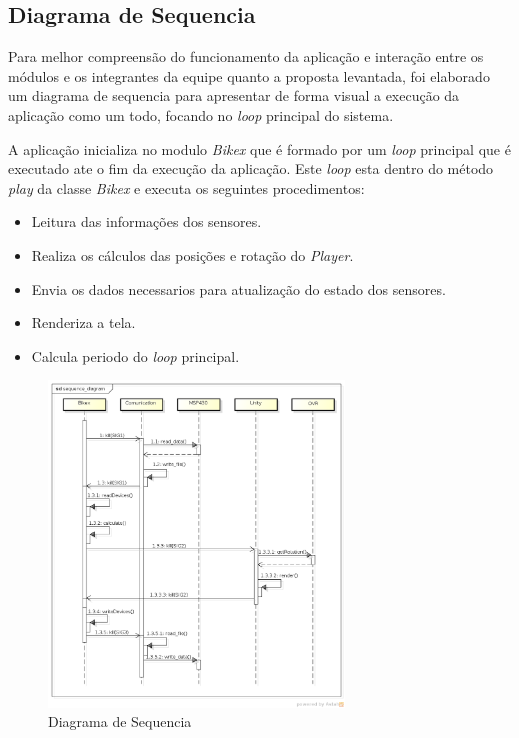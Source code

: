 \subsection{Diagrama de Sequencia} %
\label{sec:diagrama_de_sequencia}

Para melhor compreensão do funcionamento da aplicação e interação entre os módulos e os integrantes da equipe quanto a proposta levantada, foi elaborado um diagrama de sequencia para apresentar de forma visual a execução da aplicação como um todo, focando no \textit{loop} principal do sistema.

A aplicação inicializa no modulo \textit{Bikex} que é formado por um \textit{loop} principal que é executado ate o fim da execução da aplicação. Este \textit{loop} esta dentro do método \textit{play} da classe \textit{Bikex}  e executa os seguintes procedimentos:


\begin{itemize}
	\item Leitura das informações dos sensores.
	\item Realiza os cálculos das posições e rotação do \textit{Player}.
	\item Envia os dados necessarios para atualização do estado dos sensores.
	\item Renderiza a tela.
	\item Calcula periodo do \textit{loop} principal.
\end{itemize}


\begin{figure}[h]
  \centering
	\includegraphics[width=0.7\textwidth]{figuras/sequence_diagram}
  \caption{Diagrama de Sequencia}
  \label{fig:diagrama-sequencia}
\end{figure}


